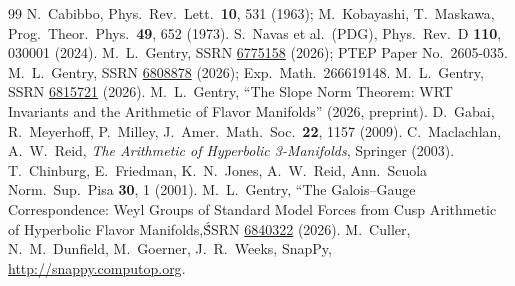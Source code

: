 \documentclass[11pt,a4paper]{article}
\theoremstyle{remark}
\begin{document}
\begin{thebibliography}{99}
N.~Cabibbo, Phys.\ Rev.\ Lett.\ \textbf{10}, 531 (1963);
M.~Kobayashi, T.~Maskawa, Prog.\ Theor.\ Phys.\ \textbf{49}, 652 (1973).
S.~Navas et al.\ (PDG), Phys.\ Rev.\ D \textbf{110}, 030001 (2024).
M.~L.~Gentry, SSRN \href{https://doi.org/10.2139/ssrn.6775158}{6775158}
(2026); PTEP Paper No.\ 2605-035.
M.~L.~Gentry, SSRN \href{https://doi.org/10.2139/ssrn.6808878}{6808878}
(2026); Exp.\ Math.\ 266619148.
M.~L.~Gentry, SSRN \href{https://doi.org/10.2139/ssrn.6815721}{6815721}
(2026).
M.~L.~Gentry, ``The Slope Norm Theorem: WRT Invariants and the
Arithmetic of Flavor Manifolds'' (2026, preprint).
D.~Gabai, R.~Meyerhoff, P.~Milley,
J.\ Amer.\ Math.\ Soc.\ \textbf{22}, 1157 (2009).
C.~Maclachlan, A.~W.~Reid,
\emph{The Arithmetic of Hyperbolic 3-Manifolds}, Springer (2003).
T.~Chinburg, E.~Friedman, K.~N.~Jones, A.~W.~Reid,
Ann.\ Scuola Norm.\ Sup.\ Pisa \textbf{30}, 1 (2001).
M.~L.~Gentry, ``The Galois--Gauge Correspondence: Weyl Groups of
Standard Model Forces from Cusp Arithmetic of Hyperbolic Flavor
Manifolds,\'\' SSRN \href{https://doi.org/10.2139/ssrn.6840322}{6840322} (2026).
M.~Culler, N.~M.~Dunfield, M.~Goerner, J.~R.~Weeks,
SnapPy, \url{http://snappy.computop.org}.
\end{thebibliography}
\end{document}
